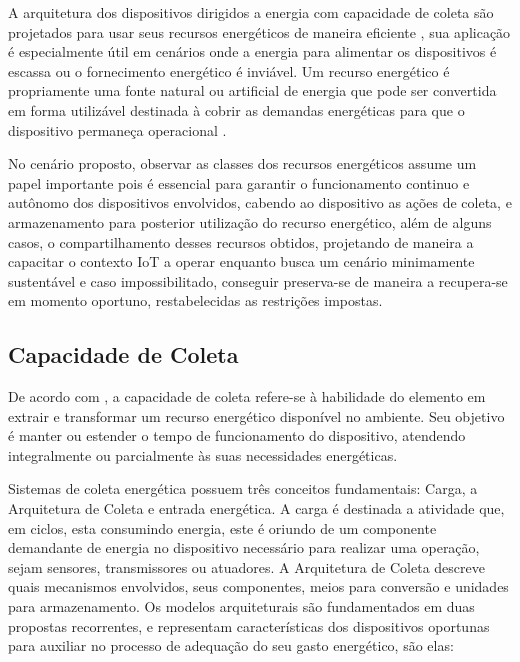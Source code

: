 A arquitetura dos dispositivos dirigidos a energia com capacidade de coleta são projetados para usar seus recursos energéticos de maneira eficiente \cite{prauzek_energy_2018}, sua aplicação é especialmente útil em cenários onde a energia para alimentar os dispositivos é escassa ou o fornecimento energético é inviável. Um recurso energético é propriamente uma fonte natural ou artificial de energia que pode ser convertida em forma utilizável destinada à cobrir as demandas energéticas para que o dispositivo permaneça operacional \cite{kansal_power_2007}.

No cenário proposto, observar as classes dos recursos energéticos assume um papel importante pois é essencial para garantir o funcionamento continuo e autônomo dos dispositivos envolvidos, cabendo ao dispositivo as ações de coleta, e armazenamento para posterior utilização do recurso energético, além de alguns casos, o compartilhamento desses recursos obtidos, projetando de maneira a capacitar o contexto \acs{IoT} a operar enquanto busca um cenário minimamente sustentável e caso impossibilitado, conseguir preserva-se de maneira a recupera-se em momento oportuno, restabelecidas as restrições impostas.

\subsection{Capacidade de Coleta}
\label{Capacidade de Coleta}
De acordo com , a capacidade de coleta refere-se à habilidade do elemento em extrair e transformar um recurso energético disponível no ambiente. Seu objetivo é manter ou estender o tempo de funcionamento do dispositivo, atendendo integralmente ou parcialmente às suas necessidades energéticas.

Sistemas de coleta energética possuem três conceitos fundamentais: Carga, a Arquitetura de Coleta e entrada energética. A carga é destinada a atividade que, em ciclos, esta consumindo energia, este é oriundo de um componente demandante de energia no dispositivo necessário para realizar uma operação, sejam sensores, transmissores ou  atuadores. A Arquitetura de Coleta descreve quais mecanismos envolvidos, seus componentes, meios para conversão e unidades para armazenamento. Os modelos arquiteturais são fundamentados em duas propostas recorrentes, e representam características dos dispositivos oportunas para auxiliar no processo de adequação do seu gasto energético, são elas:


